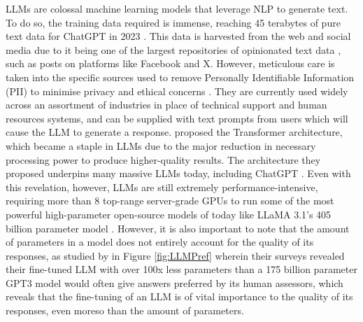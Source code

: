 \documentclass[12pt]{report}
\begin{document}
    LLMs are colossal machine learning models that leverage NLP to generate text. To do so, the training data required is immense, 
    reaching 45 terabytes of pure text data for ChatGPT in 2023 \autocite{dwivedi_so_2023}. This data is harvested from the web \autocite{dubey_llama_2024}
    and social media due to it being one of the largest repositories of opinionated text data \autocite{wang_fine-grained_2016}, 
    such as posts on platforms like Facebook and X. However, meticulous care is taken into the specific sources used to remove 
    Personally Identifiable Information (PII) to minimise privacy and ethical concerns \autocite{dubey_llama_2024}. They are currently used widely across 
    an assortment of industries in place of technical support and human resources systems, and can be supplied with text 
    prompts from users which will cause the LLM to generate a response. \textcite{vaswani_attention_2017} proposed the 
    Transformer architecture, which became a staple in LLMs due to the major reduction in necessary processing power to produce higher-quality 
    results. The architecture they proposed underpins many massive LLMs today, including ChatGPT \autocite{brown_language_2020}. Even with this revelation, however, LLMs are still extremely performance-intensive,
    requiring more than 8 top-range server-grade GPUs to run some of the most powerful high-parameter open-source models of today like LLaMA 3.1's 405 billion parameter model \autocite{dubey_llama_2024}.
    However, it is also important to note that the amount of parameters in a model does not entirely account for the quality of its responses, as studied by \textcite{ouyang_training_2022}
    in Figure \ref{fig:LLMPref} wherein their surveys revealed their fine-tuned LLM with over 100x less parameters than a 175 billion parameter 
    GPT3 model would often give answers preferred by its human assessors, which reveals that the fine-tuning of an LLM is of vital importance 
    to the quality of its responses, even moreso than the amount of parameters.  
    
\end{document}
